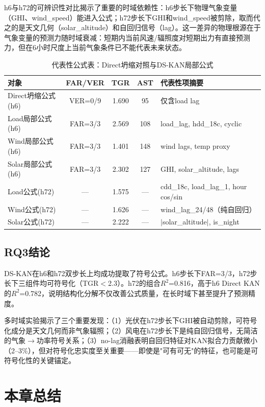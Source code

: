 \documentclass[12pt,a4paper,oneside]{ctexbook}
\begin{document}
h6与h72的可辨识性对比揭示了重要的时域依赖性：h6步长下物理气象变量（GHI、wind\_speed）能进入公式；h72步长下GHI和wind\_speed被剪除，取而代之的是天文几何（solar\_altitude）和自回归信号（lag）。这一差异的物理根源在于气象变量的预测力随时域衰减：短期内当前风速/辐照度对短期出力有直接预测力，但在6小时尺度上当前气象条件已不能代表未来状态。

\begin{table}[htbp]
\centering
\caption{代表性公式表：Direct坍缩对照与DS-KAN局部公式}
\label{tab:representative-formulas}
\begin{tabularx}{\textwidth}{lcccl}
\toprule
对象 & FAR/VER & TGR & AST & 代表性项摘要 \\
\midrule
Direct坍缩公式(h6) & VER=0/9 & 1.690 & 95 & 仅含load lag \\
Load局部公式(h6) & FAR=3/3 & 2.569 & 108 & load\_lag, hdd\_18c, cyclic \\
Wind局部公式(h6) & FAR=3/3 & 1.401 & 148 & wind lags, temp proxy \\
Solar局部公式(h6) & FAR=3/3 & 2.302 & 127 & GHI, solar\_altitude, lags \\
\midrule
Load公式(h72) & — & 1.575 & — & cdd\_18c, load\_lag\_1, hour cos/sin \\
Wind公式(h72) & — & 1.626 & — & wind\_lag\_24/48（纯自回归） \\
Solar公式(h72) & — & 2.222 & — & $|$solar\_altitude$|$, is\_night \\
\bottomrule
\end{tabularx}
\end{table}

\subsection{RQ3结论}

DS-KAN在h6和h72双步长上均成功提取了符号公式。h6步长下FAR=3/3，h72步长下三组件均可符号化（TGR$<$2.3）。h72的组合$R^2$=0.816，高于h6 Direct KAN的$R^2$=0.782，说明结构化分解不仅改善公式质量，在长时域下甚至提升了预测精度。

多时域实验揭示了三个重要发现：（1）光伏在h72步长下GHI被自动剪除，可符号化成分是天文几何而非气象辐照；（2）风电在h72步长下是纯自回归信号，无简洁的气象$\to$功率符号关系；（3）no-lag消融表明自回归特征对KAN拟合力贡献微小（2--3\%），但对符号化忠实度至关重要——即使是"可有可无"的特征，也可能是可符号化性的关键锚定。

\section{本章总结}
\end{document}
